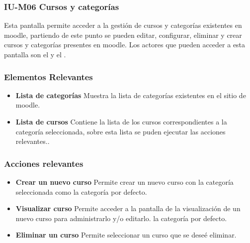 
\subsubsection{IU-M06 Cursos y categorías}

 Esta pantalla permite acceder a la gestión de cursos y categorías existentes en
 moodle, partiendo de este punto se pueden editar, configurar, eliminar y crear
 cursos y categorías presentes en moodle. Los actores que pueden acceder a esta
 pantalla son el  y el .


\subsubsection{Elementos Relevantes}

    \begin{itemize}
    \item {\bf Lista de categorías}
        Muestra la lista de categorías existentes en el sitio de moodle.
    \item {\bf Lista de cursos}
        Contiene la lista de los cursos correspondientes a la categoría
        seleccionada, sobre esta lista se puden ejecutar las acciones
        relevantes..
    \end{itemize}

\subsubsection{Acciones relevantes}

    \begin{itemize}
    \item {\bf Crear un nuevo curso}
        Permite crear un nuevo curso con la categoría seleccionada como
        la categoría por defecto.
    \item {\bf Visualizar curso}
        Permite acceder a la pantalla de la visualización de un nuevo curso
        para administrarlo y/o editarlo.
        la categoría por defecto.
    \item {\bf Eliminar un curso}
        Permite seleccionar un curso que se deseé eliminar.
    \end{itemize}

\clearpage
